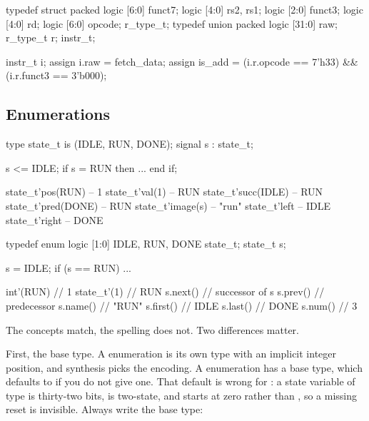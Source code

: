 \begin{svcode}[caption={A packed union: two views of the same 32 bits.},label={lst:rosetta:union}]
typedef struct packed { logic [6:0] funct7; logic [4:0] rs2, rs1;
                        logic [2:0] funct3; logic [4:0] rd;
                        logic [6:0] opcode; } r_type_t;
typedef union packed {
  logic [31:0] raw;
  r_type_t     r;
} instr_t;

instr_t i;
assign i.raw    = fetch_data;
assign is_add   = (i.r.opcode == 7'h33) && (i.r.funct3 == 3'b000);
\end{svcode}

\subsection{Enumerations}

\begin{rosetta}
\begin{rleft}
type state_t is
  (IDLE, RUN, DONE);
signal s : state_t;

s <= IDLE;
if s = RUN then ... end if;

state_t'pos(RUN)    -- 1
state_t'val(1)      -- RUN
state_t'succ(IDLE)  -- RUN
state_t'pred(DONE)  -- RUN
state_t'image(s)    -- "run"
state_t'left        -- IDLE
state_t'right       -- DONE
\end{rleft}
\begin{rright}
typedef enum logic [1:0] {
  IDLE, RUN, DONE
} state_t;
state_t s;

s = IDLE;
if (s == RUN) ...

int'(RUN)      // 1
state_t'(1)    // RUN
s.next()       // successor of s
s.prev()       // predecessor
s.name()       // "RUN"
s.first()      // IDLE
s.last()       // DONE
s.num()        // 3
\end{rright}
\end{rosetta}


The concepts match, the spelling does not. Two differences matter.

First, the base type. A \VHDL{} enumeration is its own type with an implicit
integer position, and synthesis picks the encoding. A \SV{} enumeration has a
base type, which defaults to  if you do not give one. That default is
wrong for \RTL{}: a state variable of type  is thirty-two bits, is
two-state, and starts at zero rather than , so a missing reset is
invisible. Always write the base type:

